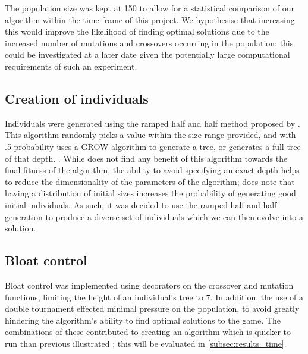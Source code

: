 \documentclass[british,10pt,a4paper]{article}
\begin{document}
The population size was kept at 150 to allow for a statistical comparison of our algorithm within the time-frame of this project. We hypothesise that increasing this would improve the likelihood of finding optimal solutions due to the increased number of mutations and crossovers occurring in the population; this could be investigated at a later date given the potentially large computational requirements of such an experiment.

\subsection{Creation of individuals}
Individuals were generated using the ramped half and half method proposed by \citet{Koza1992-zm}. This algorithm randomly picks a value within the size range provided, and with .5 probability uses a GROW algorithm to generate a tree, or generates a full tree of that depth. \cite{Luke2001-ix}. While \citet{Luke2001-ix} does not find any benefit of this algorithm towards the final fitness of the algorithm, the ability to avoid specifying an exact depth helps to reduce the dimensionality of the parameters of the algorithm; \citeauthor{Luke2001-ix} does note that having a distribution of initial sizes increases the probability of generating good initial individuals. As such, it was decided to use the ramped half and half generation to produce a diverse set of individuals which we can then evolve into a solution.

\subsection{Bloat control}
Bloat control was implemented using decorators on the crossover and mutation functions, limiting the height of an individual's tree to 7. In addition, the use of a double tournament effected minimal pressure on the population, to avoid greatly hindering the algorithm's ability to find optimal solutions to the game. The combinations of these contributed to creating an algorithm which is quicker to run than previous illustrated \cite{Ehlis2000-sz}; this will be evaluated in \autoref{subsec:results_time}.
\end{document}
